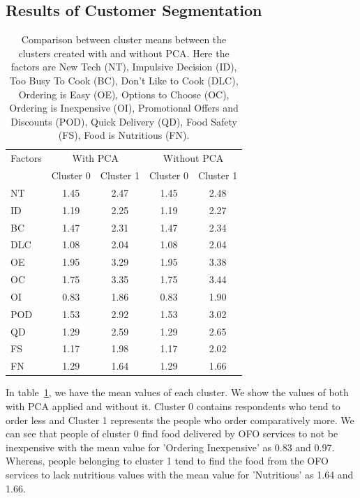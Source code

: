 \documentclass[a4paper,fleqn]{cas-sc}
\begin{document}
\subsection{Results of Customer Segmentation}
\begin{table}[htb]
\caption{Comparison between cluster means between the clusters created with and without PCA. Here the factors are New Tech (NT), Impulsive Decision (ID), Too Busy To Cook (BC), Don't Like to Cook (DLC), Ordering is Easy (OE), Options to Choose (OC), Ordering is Inexpensive (OI), Promotional Offers and Discounts (POD), Quick Delivery (QD), Food Safety (FS), Food is Nutritious (FN).}
\label{tab:k-means_results_both}
\begin{tabular*}{\linewidth}{@{\extracolsep{\fill}}lcccc@{}}
\toprule
Factors               & \multicolumn{2}{c}{With PCA} & \multicolumn{2}{c}{Without PCA} \\ 
\cmidrule(l){2-3} \cmidrule(l){4-5}
                        & Cluster 0    & Cluster 1      & Cluster 0    & Cluster 1  \\ 
\midrule    
NT                & 1.45         & 2.47           & 1.45         & 2.48       \\
ID     & 1.19         & 2.25           & 1.19         & 2.27       \\
BC            & 1.47         & 2.31           & 1.47         & 2.34       \\
DLC       & 1.08         & 2.04           & 1.08         & 2.04       \\
OE          & 1.95         & 3.29           & 1.95         & 3.38       \\
OC       & 1.75         & 3.35           & 1.75         & 3.44       \\
OI    & 0.83         & 1.86           & 0.83         & 1.90       \\
POD         & 1.53         & 2.92           & 1.53         & 3.02       \\
QD         & 1.29         & 2.59           & 1.29         & 2.65       \\
FS             & 1.17         & 1.98           & 1.17         & 2.02       \\
FN            & 1.29         & 1.64           & 1.29         & 1.66       \\ 
\bottomrule
\end{tabular*}
\end{table}

In table~\ref{tab:k-means_results_both}, we have the mean values of each cluster. We show the values of both with PCA applied and without it.  Cluster 0 contains respondents who tend to order less and Cluster 1 represents the people who order comparatively more. We can see that people of cluster 0 find food delivered by OFO services to not be inexpensive with the mean value for 'Ordering Inexpensive' as 0.83 and 0.97. Whereas, people belonging to cluster 1 tend to find the food from the OFO services to lack nutritious values with the mean value for 'Nutritious' as 1.64 and 1.66.
\end{document}
